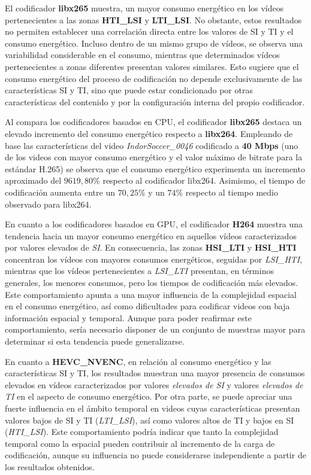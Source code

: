  El codificador \textbf{libx265} muestra, un mayor consumo energético en los vídeos pertenecientes a las zonas \textbf{HTI\_LSI} y \textbf{LTI\_LSI}. No obstante, estos resultados no permiten establecer una correlación directa entre los valores de SI y TI y el consumo energético. Incluso dentro de un mismo grupo de vídeos, se observa una variabilidad considerable en el consumo, mientras que determinados vídeos pertenecientes a zonas diferentes presentan valores similares. Esto sugiere que el consumo energético del proceso de codificación no depende exclusivamente de las características SI y TI, sino que puede estar condicionado por otras características del contenido y por la configuración interna del propio codificador.

 Al compara los codificadores basados en CPU, el codificador \textbf{libx265} destaca un elevado incremento del consumo energético respecto a \textbf{libx264}. Empleando de base las características del video \textit{IndorSoccer\_0046} codificado a \textbf{40 Mbps} (uno de los videos con mayor consumo energético y el valor máximo de bitrate para la estándar H.265) se observa que el consumo energético experimenta un incremento aproximado del \textbf{$9619,80\%$} respecto al codificador libx264. Asimismo, el tiempo de codificación aumenta entre un \textbf{$70,25\%$} y un \textbf{$74\%$} respecto al tiempo medio observado para libx264.

 En cuanto a los codificadores basados en GPU, el codificador \textbf{H264} muestra una tendencia hacia un mayor consumo energético en aquellos vídeos caracterizados por valores elevados de \textit{SI}. En consecuencia, las zonas \textbf{HSI\_LTI} y \textbf{HSI\_HTI} concentran los vídeos con mayores consumos energéticos, seguidas por \textit{LSI\_HTI}, mientras que los vídeos pertenecientes a \textit{LSI\_LTI} presentan, en términos generales, los menores consumos, pero los tiempos de codificación más elevados. Este comportamiento apunta a una mayor influencia de la complejidad espacial en el consumo energético, así como dificultades para codificar videos con baja información espacial y temporal. Aunque para poder reafirmar este comportamiento, sería necesario disponer de un conjunto de muestras mayor para determinar si esta tendencia puede generalizarse.

 En cuanto a \textbf{HEVC\_NVENC}, en relación al consumo energético y las características SI y TI, los resultados muestran una mayor presencia de consumos elevados en vídeos caracterizados por valores \textit{elevados de SI} y valores \textit{elevados de TI} en el aspecto de consumo energético. Por otra parte, se puede apreciar una fuerte influencia en el ámbito temporal en videos cuyas características presentan valores bajos de SI y TI (\textit{LTI\_LSI}), así como valores altos de TI y bajos en SI (\textit{HTI\_LSI}). Este comportamiento podría indicar que tanto la complejidad temporal como la espacial pueden contribuir al incremento de la carga de codificación, aunque su influencia no puede considerarse independiente a partir de los resultados obtenidos.
 
